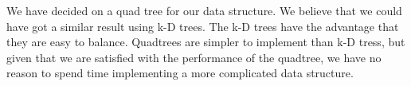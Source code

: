 We have decided on a quad tree for our data structure. We believe that we could have got a similar result using k-D trees. The k-D trees have the advantage that they are easy to balance. Quadtrees are simpler to implement than k-D tress, but given that we are satisfied with the performance of the quadtree, we have no reason to spend time implementing a more complicated data structure.